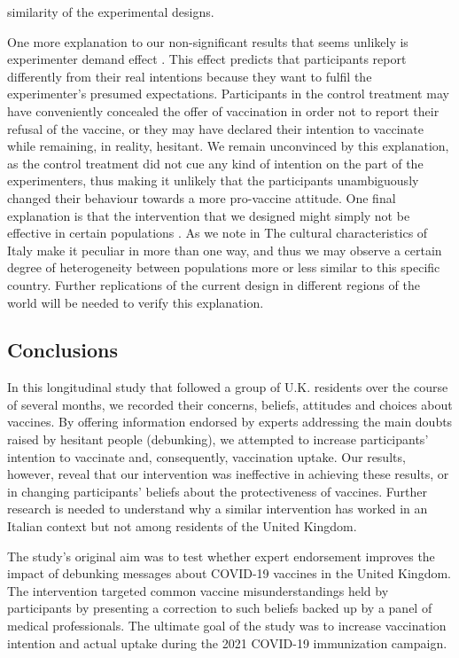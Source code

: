\documentclass[authordate, empirical]{jote-new-article}
\begin{document}
similarity of the experimental designs.



	One more explanation to our non-significant results that seems unlikely is experimenter demand effect \parencites{Zizzo2009}. This effect predicts that participants report differently from their real intentions because they want to fulfil the experimenter's presumed expectations. Participants in the control treatment may have conveniently concealed the offer of vaccination in order not to report their refusal of the vaccine, or they may have declared their intention to vaccinate while remaining, in reality, hesitant. We remain unconvinced by this explanation, as the control treatment did not cue any kind of intention on the part of the experimenters, thus making it unlikely that the participants unambiguously changed their behaviour towards a more pro-vaccine attitude. One final explanation is that the intervention that we designed might simply not be effective in certain populations \parencites{Bryan2021}. As we note in \textcite{Ronzani2022} The cultural characteristics of Italy make it peculiar in more than one way, and thus we may observe a certain degree of heterogeneity between populations more or less similar to this specific country. Further replications of the current design in different regions of the world will be needed to verify this explanation.







	\subsection{Conclusions}



	In this longitudinal study that followed a group of U.K. residents over the course of several months, we recorded their concerns, beliefs, attitudes and choices about vaccines. By offering information endorsed by experts addressing the main doubts raised by hesitant people (debunking), we attempted to increase participants' intention to vaccinate and, consequently, vaccination uptake. Our results, however, reveal that our intervention was ineffective in achieving these results, or in changing participants' beliefs about the protectiveness of vaccines. Further research is needed to understand why a similar intervention has worked in an Italian context but not among residents of the United Kingdom.

	\begin{originalPurpose}



		The study's original aim was to test whether expert endorsement improves the impact of debunking messages about COVID-19 vaccines in the United Kingdom. The intervention targeted common vaccine misunderstandings held by participants by presenting a correction to such beliefs backed up by a panel of medical professionals. The ultimate goal of the study was to increase vaccination intention and actual uptake during the 2021 COVID-19 immunization campaign.
	
		\end{originalPurpose}
\end{document}
